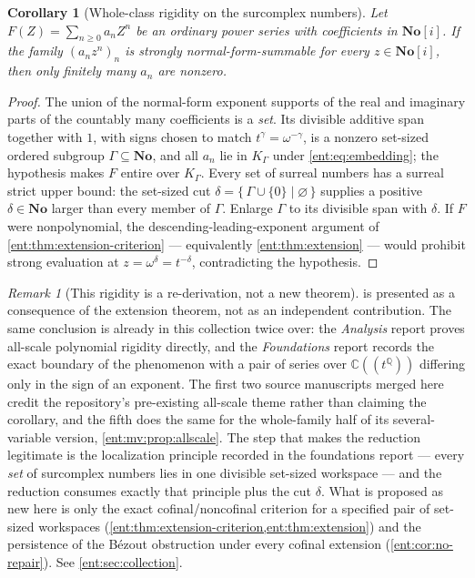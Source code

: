 \documentclass[11pt]{article}
\theoremstyle{plain}
\theoremstyle{plain}
\theoremstyle{plain}
\newtheorem{corollary}[corollary]{Corollary}
\theoremstyle{definition}
\theoremstyle{definition}
\theoremstyle{definition}
\theoremstyle{definition}
\theoremstyle{remark}
\newtheorem{remark}[remark]{Remark}
\newcommand{\C}{\mathbb C}\newcommand{\R}{\mathbb R}
\newcommand{\Q}{\mathbb Q}\newcommand{\Z}{\mathbb Z}\newcommand{\N}{\mathbb N}
\newcommand{\No}{\mathbf{No}}
\newcommand{\K}{K_\Gamma}\newcommand{\KD}{K_\Delta}
\begin{document}
\begin{corollary}[Whole-class rigidity on the surcomplex numbers]
\label{ent:cor:all-no}
Let $F(Z)=\sum_{n\ge0}a_nZ^n$ be an ordinary power series with coefficients
in $\No[i]$. If the family $(a_nz^n)_n$ is strongly normal-form-summable for
every $z\in\No[i]$, then only finitely many $a_n$ are nonzero.
\end{corollary}
\begin{proof}
The union of the normal-form exponent supports of the real and imaginary
parts of the countably many coefficients is a \emph{set}. Its divisible
additive span together with $1$, with signs chosen to match
$t^\gamma=\omega^{-\gamma}$, is a nonzero set-sized ordered subgroup
$\Gamma\subseteq\No$, and all $a_n$ lie in $\K$ under
\eqref{ent:eq:embedding}; the hypothesis makes $F$ entire over $\K$. Every
set of surreal numbers has a surreal strict upper bound: the set-sized cut
$\delta=\{\,\Gamma\cup\{0\}\mid\varnothing\,\}$ supplies a positive
$\delta\in\No$ larger than every member of $\Gamma$. Enlarge $\Gamma$ to its
divisible span with $\delta$. If $F$ were nonpolynomial, the
descending-leading-exponent argument of
\cref{ent:thm:extension-criterion} --- equivalently
\cref{ent:thm:extension} --- would prohibit strong evaluation at
$z=\omega^{\delta}=t^{-\delta}$, contradicting the hypothesis.
\end{proof}

\begin{remark}[This rigidity is a re-derivation, not a new theorem]
\label{ent:rem:rigidity-credit}
 is presented as a consequence of the extension theorem,
not as an independent contribution. The same conclusion is already in this
collection twice over: the \emph{Analysis} report proves all-scale polynomial
rigidity directly, and the \emph{Foundations} report records the exact
boundary of the phenomenon with a pair of series over $\C((t^\Q))$ differing
only in the sign of an exponent. The first two source manuscripts merged
here credit the repository's pre-existing all-scale theme rather than
claiming the corollary, and the fifth does the same for the whole-family half
of its several-variable version, \cref{ent:mv:prop:allscale}. The step that makes the reduction legitimate is the localization
principle recorded in the foundations report --- every \emph{set} of
surcomplex numbers lies in one divisible set-sized workspace --- and the
reduction consumes exactly that principle plus the cut $\delta$.
What is proposed as new here is only the exact cofinal/noncofinal criterion
for a specified pair of set-sized workspaces
(\cref{ent:thm:extension-criterion,ent:thm:extension}) and the persistence of
the B\'ezout obstruction under every cofinal extension
(\cref{ent:cor:no-repair}). See \cref{ent:sec:collection}.
\end{remark}
\end{document}
